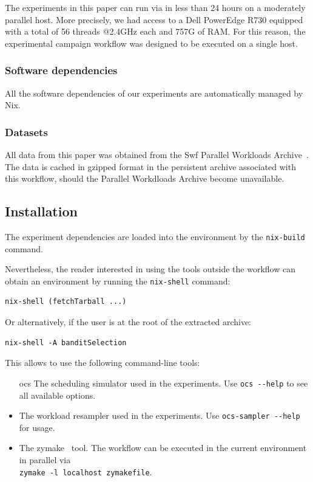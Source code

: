 \documentclass[sigconf,review,anonymous]{acmart}
\begin{document}
 The experiments in this paper can run via in less than 24 hours on a
 moderately parallel host. More precisely, we had access to a Dell PowerEdge
 R730 equipped with a total of 56 threads @2.4GHz each and 757G of RAM. For
 this reason, the experimental campaign workflow was designed to be executed on
 a single host.

\subsubsection{Software dependencies}

All the software dependencies of our experiments are automatically managed by Nix.

\subsubsection{Datasets}

All data from this paper was obtained from the Swf Parallel Workloads
Archive~\cite{Feitelson20142967}. The data is cached in gzipped format in the
persistent archive associated with this workflow, should the Parallel
Workdloads Archive become unavailable.

\subsection{Installation}

The experiment dependencies are loaded into the environment by the
\lstinline[basicstyle=\ttfamily]|nix-build| command.

Nevertheless, the reader interested in using the tools outside the workflow can
obtain an environment by running the
\lstinline[basicstyle=\ttfamily]|nix-shell| command:

\begin{lstlisting}
nix-shell (fetchTarball ...)
\end{lstlisting}

Or alternatively, if the user is at the root of the extracted archive:

\begin{lstlisting}
nix-shell -A banditSelection
\end{lstlisting}

This allows to use the following command-line tools:

\begin{itemize}

  \item[ocs] The scheduling simulator used in the experiments. Use
    \lstinline[basicstyle=\ttfamily]|ocs --help| to see all available options.

  \item[ocs-sampler] The workload resampler used in the experiments. Use
    \lstinline[basicstyle=\ttfamily]|ocs-sampler --help| for usage.

  \item[zymake] The zymake~\cite{zymake} tool.
    The workflow can be executed in the current environment in parallel
    via \\ \lstinline[basicstyle=\ttfamily]|zymake -l localhost zymakefile|.

\end{itemize}
\end{document}
